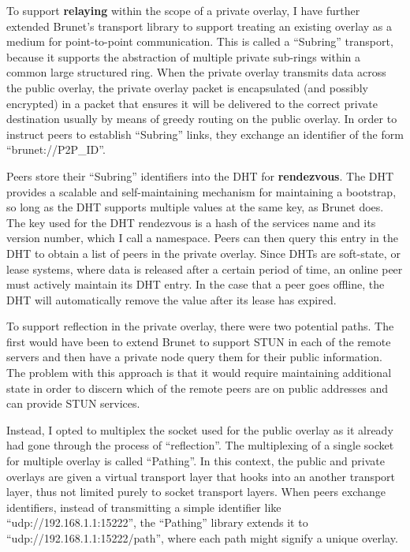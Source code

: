 To support \textbf{relaying} within the scope of a private overlay, I have
further extended Brunet's transport library to support treating an existing
overlay as a medium for point-to-point communication. This is called a
``Subring'' transport, because it supports the abstraction of multiple private
sub-rings within a common large structured ring.  When the private overlay
transmits data across the public overlay, the private overlay packet is
encapsulated (and possibly encrypted) in a packet that ensures it will be
delivered to the correct private destination usually by means of greedy routing
on the public overlay.  In order to instruct peers to establish ``Subring''
links, they exchange an identifier of the form ``brunet://P2P\_ID''.

Peers store their ``Subring'' identifiers into the DHT for \textbf{rendezvous}.
The DHT provides a scalable and self-maintaining mechanism for maintaining a
bootstrap, so long as the DHT supports multiple values at the same key, as
Brunet does.  The key used for the DHT rendezvous is a hash of the services
name and its version number, which I call a namespace.  Peers can then query
this entry in the DHT to obtain a list of peers in the private overlay.  Since
DHTs are soft-state, or lease systems, where data is released after a certain
period of time, an online peer must actively maintain its DHT entry.  In the
case that a peer goes offline, the DHT will automatically remove the value
after its lease has expired.

To support reflection in the private overlay, there were two potential paths.
The first would have been to extend Brunet to support STUN in each of the
remote servers and then have a private node query them for their public
information.  The problem with this approach is that it would require
maintaining additional state in order to discern which of the remote peers are
on public addresses and can provide STUN services.

Instead, I opted to multiplex the socket used for the public overlay as it
already had gone through the process of ``reflection''.  The multiplexing of a
single socket for multiple overlay is called ``Pathing''.  In this context, the
public and private overlays are given a virtual transport layer that hooks into
an another transport layer, thus not limited purely to socket transport layers.
When peers exchange identifiers, instead of transmitting a simple identifier
like ``udp://192.168.1.1:15222'', the ``Pathing'' library extends it to
``udp://192.168.1.1:15222/path'', where each path might signify a unique
overlay.

